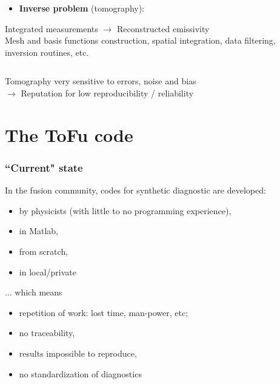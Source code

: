 \documentclass[10pt]{beamer}
\begin{document}
\begin{frame}
\begin{columns}
\begin{column}{0.675\textwidth}
\begin{center}
   	\begin{block}{}
	\begin{itemize}
	\item \textcolor{myblue}{\textbf{Inverse problem} (tomography):\\
	}
	\end{itemize}
	\end{block}
Integrated measurements $\longrightarrow$ Reconstructed emissivity \\
	\textcolor{SchoolColor}{Mesh and basis functions construction, spatial integration, data filtering, inversion routines, etc.}
   	
   	\end{center}
	
   	\end{column}
%    	
\end{columns}

\pause

\begin{block}{}
\begin{center}
Tomography very sensitive to errors, noise and bias\\
$\longrightarrow$ \textcolor{SchoolColor}{Reputation for low reproducibility / reliability }
\end{center}
	\end{block}
\end{frame}



\section{The ToFu code}


\begin{frame}
\frametitle{``Current" state}

	In the fusion community, codes for synthetic diagnostic are developed:
	\begin{itemize}
		\item  by physicists (with little to no programming experience),
		\item  in Matlab,
		\item  from scratch,
		\item  in local/private 
	\end{itemize}

... which means
\begin{itemize}
		\item  repetition of work: lost time, man-power, etc;
		\item  no traceability,
		\item  results impossible to reproduce,
		\item  no standardization of diagnostics
	\end{itemize}
	
\end{frame}
\end{document}
